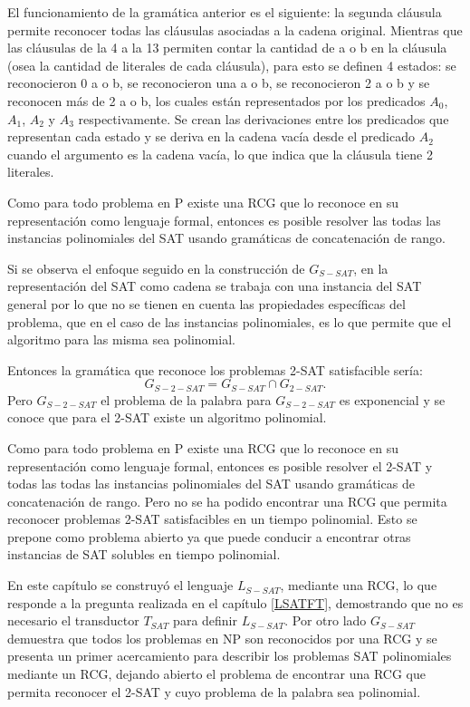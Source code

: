 \documentclass[12pt]{article}
\begin{document}
El funcionamiento de la gramática anterior es el siguiente: la segunda cláusula permite reconocer todas las
cláusulas asociadas a la cadena original. Mientras que las cláusulas de la 4 a la 13 permiten contar
la cantidad de a o b en la cláusula (osea la cantidad de literales de cada cláusula), para esto se definen
4 estados: se reconocieron 0 a o b, se reconocieron una a o b, se reconocieron 2 a o b y se reconocen
más de 2 a o b, los cuales están representados por los predicados $A_0$, $A_1$, $A_2$ y $A_3$ respectivamente.
Se crean las derivaciones entre los predicados que representan cada estado y se deriva en la cadena vacía
desde el predicado $A_2$ cuando el argumento es la cadena vacía, lo que indica que la cláusula tiene 2 literales.


Como para todo problema en P existe una RCG que lo reconoce en su representación como lenguaje formal,
entonces es posible resolver las todas las instancias polinomiales del SAT usando gramáticas de
concatenación de rango.

Si se observa el enfoque seguido en la construcción de $G_{S-SAT}$, en la representación del SAT como cadena se
trabaja con una instancia del SAT general por lo que no se tienen en cuenta las propiedades específicas
del problema, que en el caso de las instancias polinomiales, es lo que permite que el algoritmo para las
misma sea polinomial.

Entonces la gramática que reconoce los problemas 2-SAT satisfacible sería:
$$G_{S-2-SAT}=G_{S-SAT}\cap G_{2-SAT}.$$
Pero $G_{S-2-SAT}$ el problema de la palabra para $G_{S-2-SAT}$ es exponencial y se conoce que para el 2-SAT
existe un algoritmo polinomial.

Como para todo problema en P existe una RCG que lo reconoce en su representación como lenguaje formal,
entonces es posible resolver el 2-SAT y todas las todas las instancias polinomiales del SAT usando gramáticas de
concatenación de rango. Pero no se ha podido encontrar una RCG que permita reconocer problemas 2-SAT satisfacibles
en un tiempo polinomial. Esto se prepone como problema abierto ya que puede conducir a encontrar otras instancias
de SAT solubles en tiempo polinomial.

En este capítulo se construyó el lenguaje $L_{S-SAT}$, mediante una RCG, lo que responde a la pregunta realizada en
el capítulo \ref{LSATFT}, demostrando que no es necesario el transductor $T_{SAT}$ para definir $L_{S-SAT}$. Por otro
lado $G_{S-SAT}$ demuestra que todos los problemas en NP son reconocidos por una RCG y se presenta un primer acercamiento
para describir los problemas SAT polinomiales mediante un RCG, dejando abierto el problema de encontrar una RCG 
que permita reconocer el 2-SAT y cuyo problema de la palabra sea polinomial.
\end{document}
